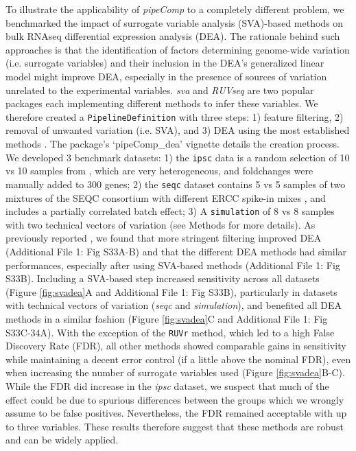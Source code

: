 \documentclass{bmcart}
\begin{document}
To illustrate the applicability of \textit{pipeComp} to a completely different problem, we benchmarked the impact of surrogate variable analysis (SVA)-based methods on bulk RNAseq differential expression analysis (DEA). The rationale behind such approaches is that the identification of factors determining genome-wide variation (i.e. surrogate variables) and their inclusion in the DEA's generalized linear model might improve DEA, especially in the presence of sources of variation unrelated to the experimental variables. \textit{sva} \citep{leekCapturingHeterogeneityGene2007,leekSvaPackageRemoving2012} and \textit{RUVseq} \citep{rissoNormalizationRNAseq2014a} are two popular packages each implementing different methods to infer these variables. We therefore created a \texttt{PipelineDefinition} with three steps: 1) feature filtering, 2) removal of unwanted variation (i.e. SVA), and 3) DEA using the most established methods  \citep{germainRNAontheBENCHComputationalEmpirical2016}. The package's `pipeComp\_dea' vignette details the creation process. We developed 3 benchmark datasets: 1) the \texttt{ipsc} data is a random selection of 10 vs 10 samples from \citep{carcamoOriveAnalysisTranscriptional2017}, which are very heterogeneous, and foldchanges were manually added to 300 genes; 2) the \texttt{seqc} dataset contains 5 vs 5 samples of two mixtures of the SEQC consortium with different ERCC spike-in mixes \citep{ComprehensiveAssessment2014}, and includes a partially correlated batch effect; 3) A \texttt{simulation} of 8 vs 8 samples with two technical vectors of variation (see Methods for more details). As previously reported \citep{ComprehensiveAssessment2014}, {\color{red} we found that more stringent filtering improved DEA (Additional File 1: Fig S33A-B) and that the different DEA methods had similar performances, especially after using SVA-based methods (Additional File 1: Fig S33B). Including a SVA-based step increased sensitivity across all datasets (Figure \ref{fig:svadea}A and Additional File 1: Fig S33B)}, particularly in datasets with technical vectors of variation (\textit{seqc} and \textit{simulation}), and benefited all DEA methods in a similar fashion (Figure \ref{fig:svadea}C and Additional File 1: Fig S33C-34A). With the exception of the \texttt{RUVr} method, which led to a high False Discovery Rate (FDR), all other methods showed comparable gains in sensitivity while maintaining a decent error control (if a little above the nominal FDR), even when increasing the number of surrogate variables used (Figure \ref{fig:svadea}B-C). While the FDR did increase in the \textit{ipsc} dataset, we suspect that much of the effect could be due to spurious differences \citep{germainTamingHumanGenetic2017} between the groups which we wrongly assume to be false positives. Nevertheless, the FDR remained acceptable with up to three variables. These results therefore suggest that these methods are robust and can be widely applied.
\end{document}
